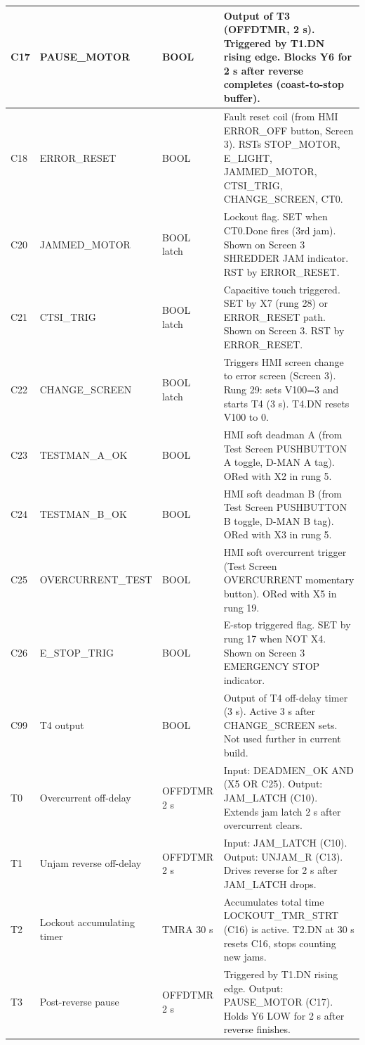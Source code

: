\documentclass[hidelinks,12pt]{article}
\begin{document}
\begin{xltabular}{\textwidth}{|l|l|l|X|}
C17 & PAUSE\_MOTOR & BOOL & Output of T3 (OFFDTMR, 2 s). Triggered by T1.DN rising edge. Blocks Y6 for 2 s after reverse completes (coast-to-stop buffer). \\ \hline
C18 & ERROR\_RESET & BOOL & Fault reset coil (from HMI ERROR\_OFF button, Screen 3). RSTs STOP\_MOTOR, E\_LIGHT, JAMMED\_MOTOR, CTSI\_TRIG, CHANGE\_SCREEN, CT0. \\ \hline
C20 & JAMMED\_MOTOR & BOOL latch & Lockout flag. SET when CT0.Done fires (3rd jam). Shown on Screen 3 SHREDDER JAM indicator. RST by ERROR\_RESET. \\ \hline
C21 & CTSI\_TRIG & BOOL latch & Capacitive touch triggered. SET by X7 (rung 28) or ERROR\_RESET path. Shown on Screen 3. RST by ERROR\_RESET. \\ \hline
C22 & CHANGE\_SCREEN & BOOL latch & Triggers HMI screen change to error screen (Screen 3). Rung 29: sets V100=3 and starts T4 (3 s). T4.DN resets V100 to 0. \\ \hline
C23 & TESTMAN\_A\_OK & BOOL & HMI soft deadman A (from Test Screen PUSHBUTTON A toggle, D-MAN A tag). ORed with X2 in rung 5. \\ \hline
C24 & TESTMAN\_B\_OK & BOOL & HMI soft deadman B (from Test Screen PUSHBUTTON B toggle, D-MAN B tag). ORed with X3 in rung 5. \\ \hline
C25 & OVERCURRENT\_TEST & BOOL & HMI soft overcurrent trigger (Test Screen OVERCURRENT momentary button). ORed with X5 in rung 19. \\ \hline
C26 & E\_STOP\_TRIG & BOOL & E-stop triggered flag. SET by rung 17 when NOT X4. Shown on Screen 3 EMERGENCY STOP indicator. \\ \hline
C99 & T4 output & BOOL & Output of T4 off-delay timer (3 s). Active 3 s after CHANGE\_SCREEN sets. Not used further in current build. \\ \hline
T0 & Overcurrent off-delay & OFFDTMR 2 s & Input: DEADMEN\_OK AND (X5 OR C25). Output: JAM\_LATCH (C10). Extends jam latch 2 s after overcurrent clears. \\ \hline
T1 & Unjam reverse off-delay & OFFDTMR 2 s & Input: JAM\_LATCH (C10). Output: UNJAM\_R (C13). Drives reverse for 2 s after JAM\_LATCH drops. \\ \hline
T2 & Lockout accumulating timer & TMRA 30 s & Accumulates total time LOCKOUT\_TMR\_STRT (C16) is active. T2.DN at 30 s resets C16, stops counting new jams. \\ \hline
T3 & Post-reverse pause & OFFDTMR 2 s & Triggered by T1.DN rising edge. Output: PAUSE\_MOTOR (C17). Holds Y6 LOW for 2 s after reverse finishes. \\ \hline

\end{xltabular}
\end{document}
